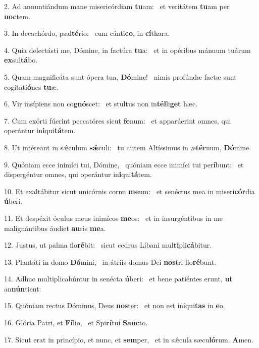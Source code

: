 2. Ad annuntiándum mane misericórdiam \textbf{tu}am: \ast\  et veritátem \textbf{tu}am per \textbf{noc}tem.\

3. In decachórdo, psal\textbf{té}rio: \ast\  cum cánti\textbf{co}, in \textbf{cí}thara.\

4. Quia delectásti me, Dómine, in factúra \textbf{tu}a: \ast\  et in opéribus mánuum tuárum \textbf{ex}sul\textbf{tá}bo.\

5. Quam magnificáta sunt ópera tua, \textbf{Dó}mine! \ast\  nimis profúndæ factæ sunt cogitati\textbf{ó}nes \textbf{tu}æ.\

6. Vir insípiens non co\textbf{gnó}scet: \ast\  et stultus non in\textbf{tél}li\textbf{get} hæc.\

7. Cum exórti fúerint peccatóres sicut \textbf{fe}num: \ast\  et apparúerint omnes, qui operántur in\textbf{i}qui\textbf{tá}tem.\

8. Ut intéreant in sǽculum \textbf{sǽ}culi: \ast\  tu autem Altíssimus in æ\textbf{tér}num, \textbf{Dó}mine.\

9. Quóniam ecce inimíci tui, Dómine, \dag\  quóniam ecce inimíci tui per\textbf{í}bunt: \ast\  et dispergéntur omnes, qui operántur in\textbf{i}qui\textbf{tá}tem.\

10. Et exaltábitur sicut unicórnis cornu \textbf{me}um: \ast\  et senéctus mea in miseri\textbf{cór}dia \textbf{ú}beri.\

11. Et despéxit óculus meus inimícos \textbf{me}os: \ast\  et in insurgéntibus in me malignántibus áudiet \textbf{au}ris \textbf{me}a.\

12. Justus, ut palma flo\textbf{ré}bit: \ast\  sicut cedrus Líbani mul\textbf{ti}pli\textbf{cá}bitur.\

13. Plantáti in domo \textbf{Dó}mini, \ast\  in átriis domus Dei \textbf{nos}tri flo\textbf{ré}bunt.\

14. Adhuc multiplicabúntur in senécta \textbf{ú}beri: \ast\  et bene patiéntes erunt, \textbf{ut} an\textbf{nún}tient:\

15. Quóniam rectus Dóminus, Deus \textbf{nos}ter: \ast\  et non est iníqui\textbf{tas} in \textbf{e}o.\

16. Glória Patri, et \textbf{Fí}lio, \ast\  et Spi\textbf{rí}tui \textbf{Sanc}to.\

17. Sicut erat in princípio, et nunc, et \textbf{sem}per, \ast\  et in sǽcula sæcu\textbf{ló}rum. \textbf{A}men.\


